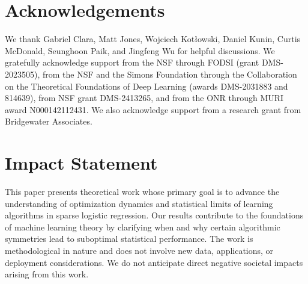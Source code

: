 \documentclass{article}
\theoremstyle{plain}
\theoremstyle{definition}
\theoremstyle{remark}
\begin{document}
\section{Acknowledgements}
We thank 
Gabriel Clara,
Matt Jones,
Wojciech Kot{\l}owski,
Daniel Kunin, 
Curtis McDonald, 
Seunghoon Paik,
and 
Jingfeng Wu 
for helpful discussions. We gratefully acknowledge support from the NSF through FODSI (grant DMS-2023505), from the NSF and the Simons Foundation through the Collaboration on the Theoretical Foundations of Deep Learning (awards DMS-2031883 and 814639), from NSF grant DMS-2413265, and from the ONR through MURI award N000142112431. We also acknowledge support from a research grant from Bridgewater Associates.


\section*{Impact Statement}

This paper presents theoretical work whose primary goal is to advance the understanding of optimization dynamics and statistical limits of learning algorithms in sparse logistic regression. Our results contribute to the foundations of machine learning theory by clarifying when and why certain algorithmic symmetries lead to suboptimal statistical performance. The work is methodological in nature and does not involve new data, applications, or deployment considerations. We do not anticipate direct negative societal impacts arising from this work.

\end{document}
